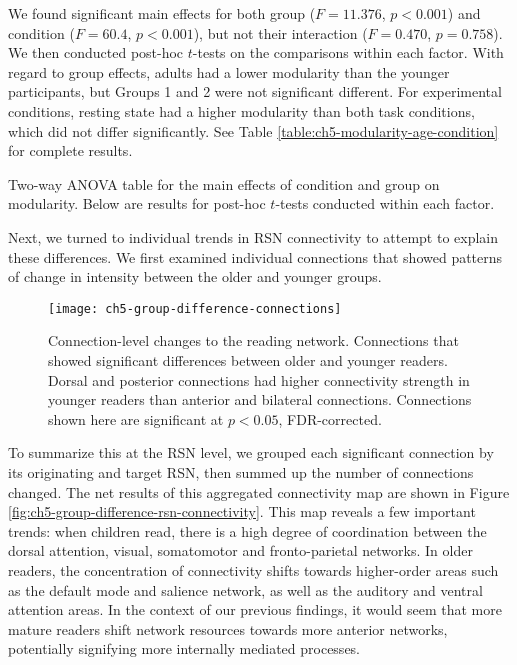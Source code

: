 We found significant main effects for both group ($F = 11.376$, $p < 0.001$) and condition ($F = 60.4$, $p < 0.001$), but not their interaction ($F=0.470$, $p = 0.758$). We then conducted post-hoc $t$-tests on the comparisons within each factor. With regard to group effects, adults had a lower modularity than the younger participants, but Groups 1 and 2 were not significant different. For experimental conditions, resting state had a higher modularity than both task conditions, which did not differ significantly. See Table \ref{table:ch5-modularity-age-condition} for complete results. 

\begin{table}[t]
	\renewcommand{\tabcolsep}{0.09cm}
	\centering
	
	\caption[Statistical results for the effects of condition and group on modularity]{Two-way ANOVA table for the main effects of condition and group on modularity. Below are results for post-hoc $t$-tests conducted within each factor.}
	\label{table:ch5-modularity-age-condition}
\end{table}

Next, we turned to individual trends in RSN connectivity to attempt to explain these differences. We first examined individual connections that showed patterns of change in intensity between the older and younger groups. 

\begin{figure}[t]
	\centering
	\texttt{[image: ch5-group-difference-connections]}
    \caption[Connection-level changes in the reading network]{Connection-level changes to the reading network. Connections that showed significant differences between older and younger readers. Dorsal and posterior connections had higher connectivity strength in younger readers than anterior and bilateral connections. Connections shown here are significant at $p < 0.05$, FDR-corrected.}
	\label{fig:ch5-group-difference-connections}
\end{figure}

To summarize this at the RSN level, we grouped each significant connection by its originating and target RSN, then summed up the number of connections changed. The net results of this aggregated connectivity map are shown in Figure \ref{fig:ch5-group-difference-rsn-connectivity}. This map reveals a few important trends: when children read, there is a high degree of coordination between the dorsal attention, visual, somatomotor and fronto-parietal networks. In older readers, the concentration of connectivity shifts towards higher-order areas such as the default mode and salience network, as well as the auditory and ventral attention areas.  In the context of our previous findings, it would seem that more mature readers shift network resources towards more anterior networks, potentially signifying more internally mediated processes.

